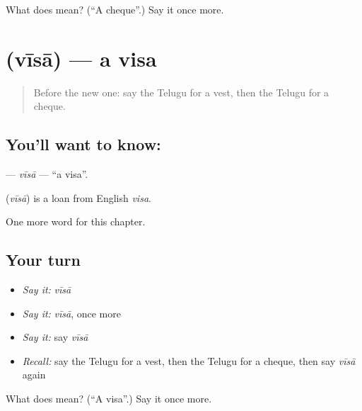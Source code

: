 \begin{tcolorbox}[breakable,colback=teal!4,colframe=teal!35!black,title={Before you move on}]
What does  mean? (\textquotedblleft{}A cheque\textquotedblright{}.) Say it once more.
\end{tcolorbox}
\section[\texorpdfstring{\te{వీసా} (vīsā)}{వీసా (vīsā)}]{ (vīsā) — a visa}

\label{lesson:TE-C264-visa}



\begin{quote}
Before the new one: say the Telugu for a vest, then the Telugu for a cheque.
\end{quote}

\subsection*{You'll want to know: }
\textbf{} — \emph{vīsā} — \textquotedblleft{}a visa\textquotedblright{}.

\begin{cousinweb}
\textbf{} (\emph{vīsā}) is a loan from English \emph{visa}.
\end{cousinweb}

\begin{grammarlens}[title={What you've built}]
One more word for this chapter.
\end{grammarlens}

\subsection*{Your turn}
\begin{itemize}
\raggedright
  \item \emph{Say it:} \emph{vīsā}
  \item \emph{Say it:} \emph{vīsā}, once more
  \item \emph{Say it:} say \emph{vīsā}
  \item \emph{Recall:} say the Telugu for a vest, then the Telugu for a cheque, then say \emph{vīsā} again
\end{itemize}

\begin{tcolorbox}[breakable,colback=teal!4,colframe=teal!35!black,title={Before you move on}]
What does  mean? (\textquotedblleft{}A visa\textquotedblright{}.) Say it once more.
\end{tcolorbox}

